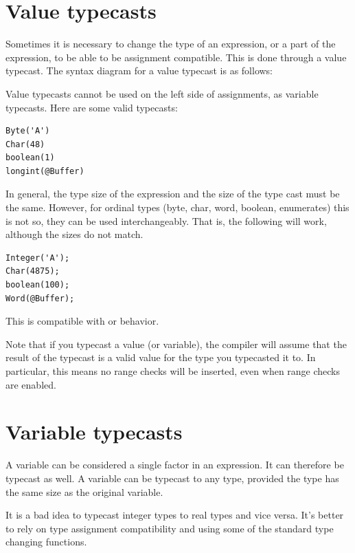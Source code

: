 \section{Value typecasts}

Sometimes it is necessary to change the type of an expression, or a part of
the expression, to be able to be assignment compatible. This is done through
a value typecast. The syntax diagram for a value typecast is as follows:

Value typecasts cannot be used on the left side of assignments, as variable
typecasts.
Here are some valid typecasts:
\begin{verbatim}
Byte('A')
Char(48)
boolean(1)
longint(@Buffer)
\end{verbatim}
In general, the type size of the expression and the size of the type cast
must be the same. However, for ordinal types (byte, char, word, boolean,
enumerates) this is not so, they can be used interchangeably.
That is, the following will work, although the sizes do not match.
\begin{verbatim}
Integer('A');
Char(4875);
boolean(100);
Word(@Buffer);
\end{verbatim}
This is compatible with \delphi or \tp behavior.

\begin{remark}
Note that if you typecast a value (or variable), the compiler will assume that the
result of the typecast is a valid value for the type you typecasted it to. 
In particular, this means no range checks will be inserted, even when range checks are
enabled.
\end{remark}

\section{Variable typecasts}
A variable can be considered a single factor in an expression. It can
therefore be typecast as well. A variable can be typecast to any type,
provided the type has the same size as the original variable.

It is a bad idea to typecast integer types to real types and vice versa.
It's better to rely on type assignment compatibility and using some of the
standard type changing functions.

